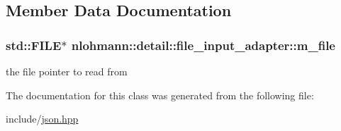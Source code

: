 \subsection{Member Data Documentation}
\subsubsection[{\texorpdfstring{m\+\_\+file}{m_file}}]{\setlength{\rightskip}{0pt plus 5cm}std\+::\+F\+I\+LE$\ast$ nlohmann\+::detail\+::file\+\_\+input\+\_\+adapter\+::m\+\_\+file\hspace{0.3cm}{\ttfamily [private]}}\hypertarget{classnlohmann_1_1detail_1_1file__input__adapter_a164fbe2739ac97e517e22bc1fff1c174}{}\label{classnlohmann_1_1detail_1_1file__input__adapter_a164fbe2739ac97e517e22bc1fff1c174}


the file pointer to read from 



The documentation for this class was generated from the following file\+:\begin{DoxyCompactItemize}
\item 
include/\hyperlink{json_8hpp}{json.\+hpp}\end{DoxyCompactItemize}
